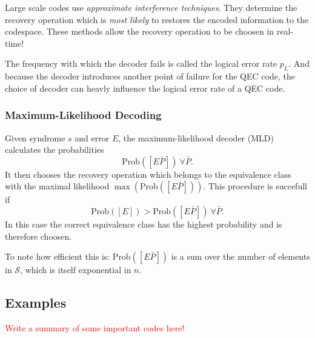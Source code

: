 Large scale codes use \textit{approximate interference techniques}.
They determine the recovery operation which is \textit{most likely} to restores the encoded information to the codespace.
These methods allow the recovery operation to be choosen in real-time! \cite{QECintro}

The frequency with which the decoder fails is called the logical error rate $p_L$. 
And because the decoder introduces another point of failure for the QEC code, the choice of decoder can heavly influence the logical error rate of a QEC code.  \cite{QECintro}


\subsubsection{Maximum-Likelihood Decoding}
Given syndrome $s$ and error $E$, the maximum-likelihood decoder (MLD) calculates the probabilities 
\begin{equation}
    \text{Prob}([E\bar{P}])\ \forall \bar{P}.
\end{equation}
It then chooses the recovery operation which belongs to the equivalence class with the maximal likelihood $\max(\text{Prob}([E\bar{P}]))$.
This procedure is succefull if 
\begin{equation}
     \text{Prob}([E])>\text{Prob}([E\bar{P}])\ \forall \bar{P}.
\end{equation}
In this case the correct equivalence class has the highest probability and is therefore choosen. \cite{QECmemory}

To note how efficient this is: $\text{Prob}([E\bar{P}])$ is a sum over the number of elements in $\mathcal{S}$, which is itself exponential in $n$. \cite{QECmemory}


\subsection{Examples}
\textcolor{red}{Write a summary of some important codes here!}

